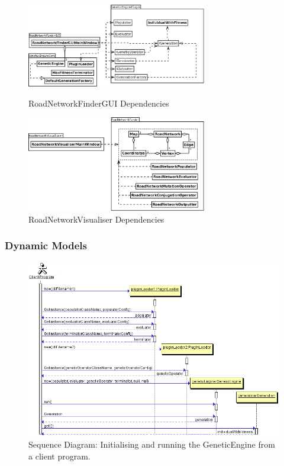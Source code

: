 \begin{figure}[ht!]
 \caption{RoadNetworkFinderGUI Dependencies}
 \centering
 \includegraphics[width=0.7\textwidth]{../RoadNetworkFinderGUI.png}\label{fig:RoadNetworkFinderGUIDependencies}
\end{figure}

\begin{figure}[ht!]
 \caption{RoadNetworkVisualiser Dependencies}\label{fig:RoadNetworkVisualiserDependencies}
 \centering
 \includegraphics[width=0.7\textwidth]{../RoadNetworkVisualiser.png}
\end{figure}

\clearpage

\subsubsection{Dynamic Models}

\begin{figure}[ht!]
 \caption{Sequence Diagram: Initialising and running the GeneticEngine from a client program.}\label{fig:Dynamic}
 \centering
 \includegraphics[width=\textwidth]{../Dynamic.png}
\end{figure}

